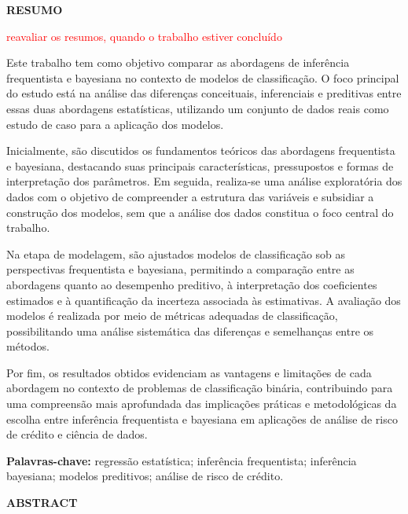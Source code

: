 \documentclass[
  brazilian,
  12pt,
  letterpaper,
  DIV=11,
  numbers=noendperiod]{scrartcl}
\begin{document}
\newpage
\begin{center}
{\bfseries\Large RESUMO}
\end{center}

\vspace{1cm}

\textcolor{red}{reavaliar os resumos, quando o trabalho estiver concluído}

Este trabalho tem como objetivo comparar as abordagens de inferência frequentista e bayesiana no contexto de modelos de classificação. O foco principal do estudo está na análise das diferenças conceituais, inferenciais e preditivas entre essas duas abordagens estatísticas, utilizando um conjunto de dados reais como estudo de caso para a aplicação dos modelos.

Inicialmente, são discutidos os fundamentos teóricos das abordagens frequentista e bayesiana, destacando suas principais características, pressupostos e formas de interpretação dos parâmetros. Em seguida, realiza-se uma análise exploratória dos dados com o objetivo de compreender a estrutura das variáveis e subsidiar a construção dos modelos, sem que a análise dos dados constitua o foco central do trabalho.

Na etapa de modelagem, são ajustados modelos de classificação sob as perspectivas frequentista e bayesiana, permitindo a comparação entre as abordagens quanto ao desempenho preditivo, à interpretação dos coeficientes estimados e à quantificação da incerteza associada às estimativas. A avaliação dos modelos é realizada por meio de métricas adequadas de classificação, possibilitando uma análise sistemática das diferenças e semelhanças entre os métodos.

Por fim, os resultados obtidos evidenciam as vantagens e limitações de cada abordagem no contexto de problemas de classificação binária, contribuindo para uma compreensão mais aprofundada das implicações práticas e metodológicas da escolha entre inferência frequentista e bayesiana em aplicações de análise de risco de crédito e ciência de dados.

\vspace{1cm}

\noindent\textbf{Palavras-chave:} regressão estatística; inferência frequentista; inferência bayesiana; modelos preditivos; análise de risco de crédito.
\newpage

\newpage
\begin{center}
{\bfseries\Large ABSTRACT}
\end{center}
\end{document}
